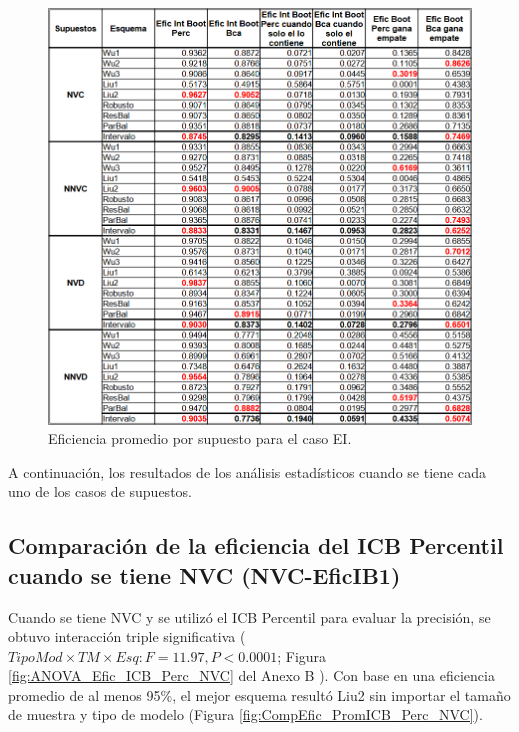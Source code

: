\begin{figure}[ht] 
	\centering 
	\includegraphics[width=0.80\linewidth]{img/EI_Prom_Supuestos.png} 
	\caption{Eficiencia promedio por supuesto para el caso EI.} 
	\label{fig:PromSupuUtiliEI}
\end{figure}





A continuación, los resultados de los análisis estadísticos cuando se tiene cada uno de los casos de supuestos.\\

\subsection{Comparación de la eficiencia del ICB Percentil cuando se tiene NVC (NVC-EficIB1)}

Cuando se tiene NVC y se utilizó el ICB Percentil para evaluar la precisión, se obtuvo interacción triple significativa ($TipoMod \times TM \times Esq: F=11.97, P<0.0001$; Figura \ref{fig:ANOVA_Efic_ICB_Perc_NVC} del Anexo B ). Con base en una eficiencia promedio de al menos 95\%, el mejor esquema resultó Liu2 sin importar el tamaño de muestra y tipo de modelo (Figura \ref{fig:CompEfic_PromICB_Perc_NVC}).\\


